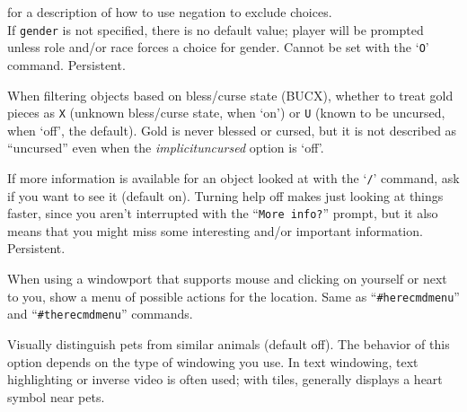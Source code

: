 \documentclass[titlepage]{article}
\begin{document}
\begin{description}[font=\mdseries\itshape]
for a description of how to use negation to exclude choices.
\\
If \texttt{gender} is not specified, there is no default value;
player will be prompted unless role and/or race forces a choice for gender.
Cannot be set with the `\texttt{O}' command.  Persistent.
\item[goldX]
When filtering objects based on bless/curse state (BUCX), whether to
treat gold pieces as \texttt{X} (unknown bless/curse state, when `on')
or \texttt{U} (known to be uncursed, when `off', the default).
Gold is never blessed or cursed, but it is not described as ``uncursed''
even when the \textit{implicit\textunderscore uncursed} option is `off'.
\item[help]
If more information is available for an object looked at
with the `\texttt{/}' command, ask if you want to see it (default on).
Turning help off makes just looking at things faster, since you aren't
interrupted with the ``\texttt{More info?}'' prompt, but it also means that you
might miss some interesting and/or important information.  Persistent.
\item[herecmd\textunderscore menu]
When using a windowport that supports mouse and clicking on yourself or
next to you, show a menu of possible actions for the location.
Same as ``\texttt{\#herecmdmenu}'' and ``\texttt{\#therecmdmenu}'' commands.
\item[hilite\textunderscore pet]
Visually distinguish pets from similar animals (default off).
The behavior of this option depends on the type of windowing you use.
In text windowing, text highlighting or inverse video is often used;
with tiles, generally displays a heart symbol near pets.


\end{description}
\end{document}

